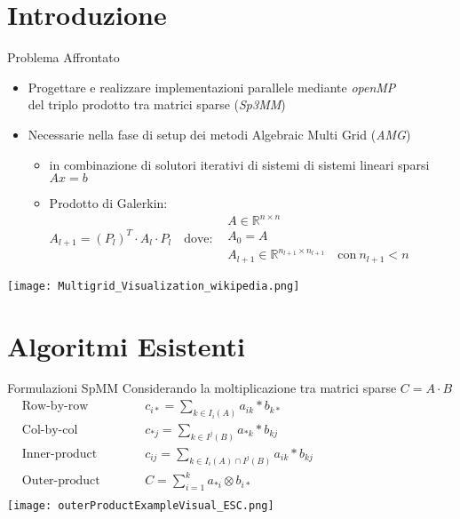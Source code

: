 \section{Introduzione}
\begin{frame}	{Problema Affrontato}
\begin{itemize}
	\item	Progettare e realizzare implementazioni parallele mediante \emph{openMP} \\
			del triplo prodotto tra matrici sparse (\emph{Sp3MM})
	\item	Necessarie nella fase di setup dei metodi Algebraic Multi Grid (\emph{AMG})
	\begin{itemize}
		\item	in combinazione di solutori iterativi di sistemi di sistemi lineari sparsi \\$Ax=b$
		\item	Prodotto di Galerkin:\\
			$A_{l+1} = (P_l)^T \cdot A_l \cdot P_l  \quad \text{dove:} 
			\begin{aligned}  
				& A \in \mathbb{R}^{n \times n} \\  
				& A_0 = A\\  
				& A_{l+1}  \in \mathbb{R}^{n_{l+1} \times n_{l+1}} \quad \text{con}~ n_{l+1}<n \end{aligned} $%
	\end{itemize}

\end{itemize}
\centering
\texttt{[image: Multigrid\_Visualization\_wikipedia.png]}
\end{frame}

\section{Algoritmi Esistenti}
\begin{frame} {Formulazioni SpMM}
Considerando la moltiplicazione tra matrici sparse $C = A\cdot B$
\voidLine
\centering
$
\begin{aligned}
  &\text{Row-by-row}	&& \qquad c_{i*} = \sum\limits_{k \in I_i(A)}  a_{ik} \ast  b_{k*}  \\
  &\text{Col-by-col}	&& \qquad c_{*j} = \sum\limits_{k \in I^j(B)}  a_{*k} \ast  b_{kj}   \\
  &\text{Inner-product}	&& \qquad c_{ij} = \sum\limits_{k \in I_i(A) \cap I^j(B) }  a_{ik} \ast  b_{kj}   \\
  &\text{Outer-product}	&& \qquad C = \sum\limits_{i=1}^k  a_{*i} \otimes  b_{i*}                \\
\end{aligned}
$\\
\texttt{[image: outerProductExampleVisual\_ESC.png]}

\end{frame}

